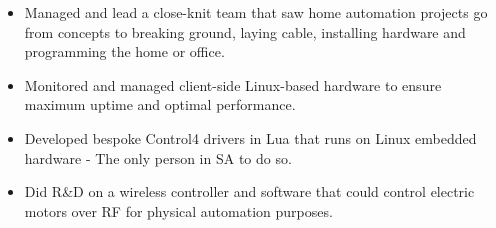 \documentclass[10pt,a4paper]{altacv}
\begin{document}
\begin{paracol}{2}
\begin{itemize}
    \item Managed and lead a close-knit team that saw home automation projects go from concepts to breaking ground, laying cable, installing hardware and programming the home or office.
    \item Monitored and managed client-side Linux-based hardware to ensure maximum uptime and optimal performance.
    \item Developed bespoke Control4 drivers in Lua that runs on Linux embedded hardware - The only person in SA to do so.
    \item Did R\&D on a wireless controller and software that could control electric motors over RF for physical automation purposes.
\end{itemize}

\divider


\divider


\divider



\end{paracol}
\end{document}
